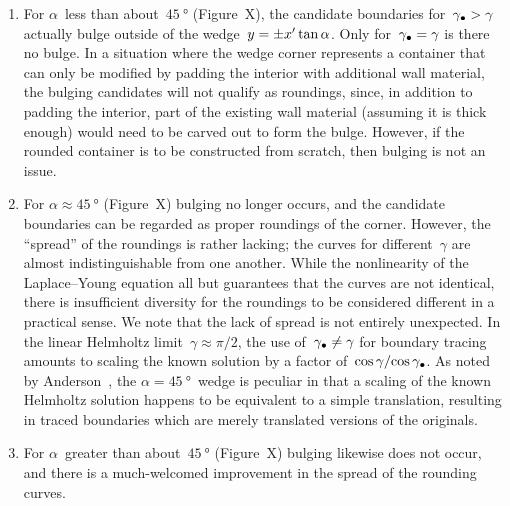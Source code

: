 \begin{enumerate}
  \item
    For $\alpha$~less than about~$\SI{45}{\degree}$
    (Figure~X), %
    the candidate boundaries for~$\gamma_\bullet > \gamma$
    actually bulge outside of the wedge~$y = \pm x' \tan\alpha$.
    Only for~$\gamma_\bullet = \gamma$ is there no bulge.
    In a situation where the wedge corner represents a container
    that can only be modified by padding the interior
    with additional wall material,
    the bulging candidates will not qualify as roundings,
    since, in addition to padding the interior,
    part of the existing wall material
    (assuming it is thick enough)
    would need to be carved out to form the bulge.
    However, if the rounded container is to be constructed from scratch,
    then bulging is not an issue.
  \item
    For $\alpha \approx \SI{45}{\degree}$
    (Figure~X) %
    bulging no longer occurs,
    and the candidate boundaries can be regarded
    as proper roundings of the corner.
    However, the ``spread'' of the roundings is rather lacking;
    the curves for different~$\gamma$ are almost indistinguishable
    from one another.
    While the nonlinearity of the Laplace--Young equation all but guarantees
    that the curves are not identical,
    there is insufficient diversity
    for the roundings to be considered different in a practical sense.
    We note that the lack of spread is not entirely unexpected.
    In the linear Helmholtz limit~$\gamma \approx \pi/2$,
    the use of~$\gamma_\bullet \ne \gamma$ for boundary tracing
    amounts to scaling the known solution
    by a factor of~$\cos\gamma / {\cos\gamma_\bullet}$.
    As noted by Anderson~\cite[(7.8)]{
      anderson-2002-thesis-boundary-tracing-pdes
    },
    the $\alpha = \SI{45}{\degree}$~wedge is peculiar
    in that a scaling of the known Helmholtz solution
    happens to be equivalent to a simple translation,
    resulting in traced boundaries which are merely translated versions
    of the originals.
  \item
    For $\alpha$~greater than about~$\SI{45}{\degree}$
    (Figure~X)
    bulging likewise does not occur,
    and there is a much-welcomed improvement
    in the spread of the rounding curves.
\end{enumerate}

